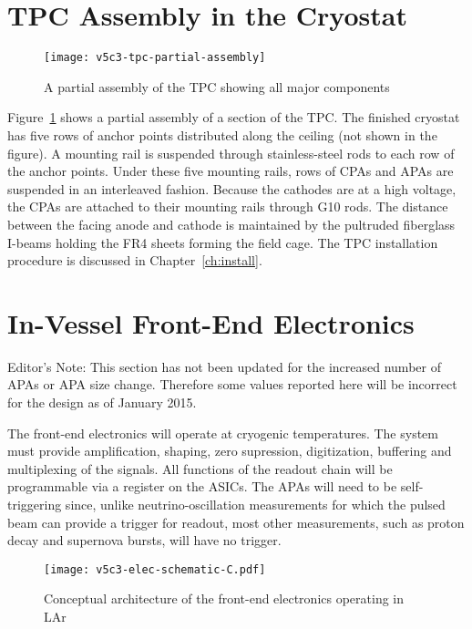 \section{TPC Assembly in the Cryostat}

\begin{figure}[htbp]
\centering
\texttt{[image: v5c3-tpc-partial-assembly]}
\caption{A partial assembly of the TPC showing all major components}
\label{fig:tpc-partial-assembly}
\end{figure}

Figure~\ref{fig:tpc-partial-assembly} shows a partial assembly of a section of the TPC.
The finished cryostat has five rows of anchor points distributed along the ceiling (not shown in the figure). 
A mounting rail is suspended through stainless-steel rods to each row of the anchor points.  Under these five mounting rails, 
rows of CPAs and APAs are suspended in an interleaved fashion. 
Because the cathodes are at a high voltage, the CPAs are attached to their 
mounting rails through G10 rods. The distance between the facing anode and 
cathode is maintained by the pultruded fiberglass I-beams holding the FR4 sheets 
forming the field cage.  The TPC installation procedure 
is discussed in Chapter~\ref{ch:install}.

\section{In-Vessel Front-End Electronics }
\label{sec:v5-tpc-elec}


\begin{editornote}
  Editor's Note:  This section has not been updated for the increased number of APAs or APA size change.  Therefore some values reported here will be incorrect for the design as of January 2015. 
\end{editornote}

The front-end electronics will operate at cryogenic temperatures. The system must provide 
amplification, shaping, zero supression, digitization, buffering and multiplexing of the signals.  All functions of the readout chain will be programmable via a register on the ASICs. The APAs will need to be
self-triggering since, unlike neutrino-oscillation measurements for which the pulsed beam 
can provide a trigger for readout, most other measurements, such as proton decay
and supernova bursts, will have no trigger.  

 
\begin{figure}[htbp]
\centering
\texttt{[image: v5c3-elec-schematic-C.pdf]}
\caption{Conceptual architecture of the front-end electronics operating in LAr}
\label{fig:tpc-elec-schematic}
\end{figure}

